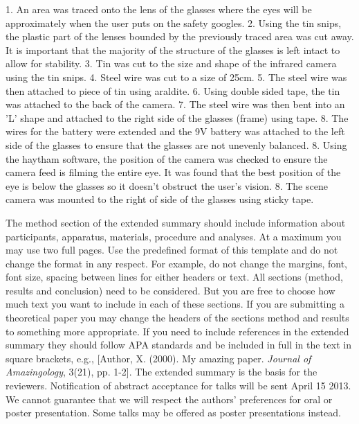 \documentclass[jou,a4paper,notxfonts]{apa}
\begin{document}
1. An area was traced onto the lens of the glasses where the eyes will be approximately when the user puts on the safety googles. 
2. Using the tin snips, the plastic part of the lenses bounded by the previously traced area was cut away. It is important that the
majority of the structure of the glasses is left intact to allow for stability.
3. Tin was cut to the size and shape of the infrared camera using the tin snips.
4. Steel wire was cut to a size of 25cm.
5. The steel wire was then attached to piece of tin using araldite.
6. Using double sided tape, the tin was attached to the back of the camera.
7. The steel wire was then bent into an 'L' shape and attached to the right side of the glasses (frame) using tape.
8. The wires for the battery were extended and the 9V battery was attached to the left side of the glasses to ensure that the glasses
are not unevenly balanced.
8. Using the haytham software, the position of the camera was checked to ensure the camera feed is filming the entire eye.
It was found that the best position of the eye is below the glasses so it doesn't obstruct the user's vision. 
8. The scene camera was mounted to the right of side of the glasses using sticky tape.



\noindent The method section of the extended summary should include information about participants, apparatus,
materials, procedure and analyses.
At a maximum you may use two full pages. Use the predefined format of this template and do not change the format in any
respect. For example, do not change the margins, font, font size, spacing between lines for either headers or text.
All sections (method, results and conclusion) need to be considered. But you are free to choose how much text you want
to include in each of these sections. If you are submitting a theoretical paper you may change the headers of the
sections method and results to something more appropriate.
If you need to include references in the extended summary they should follow APA standards and be included in full in
the text in square brackets, e.g., [Author, X. (2000). My amazing paper. \emph{Journal of Amazingology}, 3(21), pp.
1-2]. The extended summary is the basis for the reviewers. Notification of abstract acceptance for talks will be sent April 15
2013. We cannot guarantee that we will respect the authors' preferences for oral or poster presentation. Some talks may
be offered as poster presentations instead.
\end{document}
